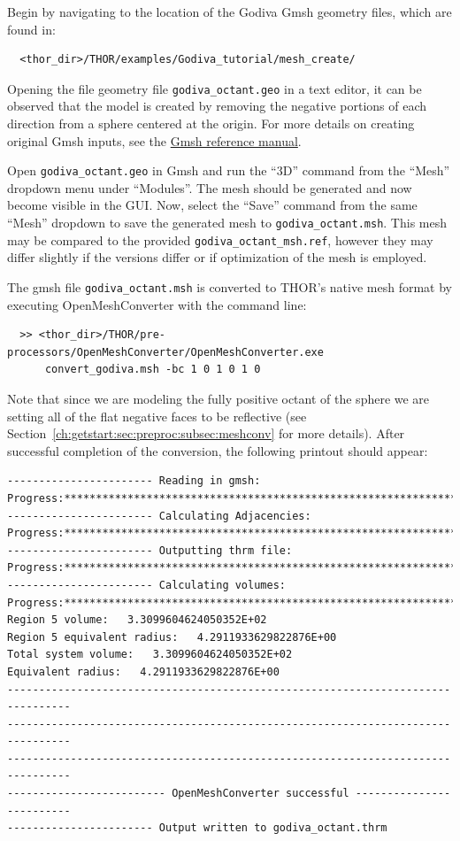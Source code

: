 Begin by navigating to the location of the Godiva Gmsh geometry files, which are found in:
\begin{verbatim}
  <thor_dir>/THOR/examples/Godiva_tutorial/mesh_create/
\end{verbatim}
Opening the file geometry file \verb"godiva_octant.geo" in a text editor, it can be observed that the model is created by removing the negative portions of each direction from a sphere centered at the origin.
For more details on creating original Gmsh inputs, see the \href{https://gmsh.info/doc/texinfo/gmsh.html}{Gmsh reference manual}.

Open \verb"godiva_octant.geo" in Gmsh and run the ``3D'' command from the ``Mesh'' dropdown menu under ``Modules''.
The mesh should be generated and now become visible in the \ac{GUI}.
Now, select the ``Save'' command from the same ``Mesh'' dropdown to save the generated mesh to \verb"godiva_octant.msh".
This mesh may be compared to the provided \verb"godiva_octant_msh.ref", however they may differ slightly if the versions differ or if optimization of the mesh is employed.

The gmsh file \verb"godiva_octant.msh" is converted to \ac{THOR}'s native mesh format by executing OpenMeshConverter with the command line:
\begin{verbatim}
  >> <thor_dir>/THOR/pre-processors/OpenMeshConverter/OpenMeshConverter.exe
      convert_godiva.msh -bc 1 0 1 0 1 0
\end{verbatim}
Note that since we are modeling the fully positive octant of the sphere we are setting all of the flat negative faces to be reflective (see Section~\ref{ch:getstart:sec:preproc:subsec:meshconv} for more details).
After successful completion of the conversion, the following printout should appear:
\begin{verbatim}
----------------------- Reading in gmsh:
Progress:***********************************************************************
----------------------- Calculating Adjacencies:
Progress:***********************************************************************
----------------------- Outputting thrm file:
Progress:***********************************************************************
----------------------- Calculating volumes:
Progress:***********************************************************************
Region 5 volume:   3.3099604624050352E+02
Region 5 equivalent radius:   4.2911933629822876E+00
Total system volume:   3.3099604624050352E+02
Equivalent radius:   4.2911933629822876E+00
--------------------------------------------------------------------------------
--------------------------------------------------------------------------------
--------------------------------------------------------------------------------
------------------------- OpenMeshConverter successful -------------------------
----------------------- Output written to godiva_octant.thrm
\end{verbatim}

